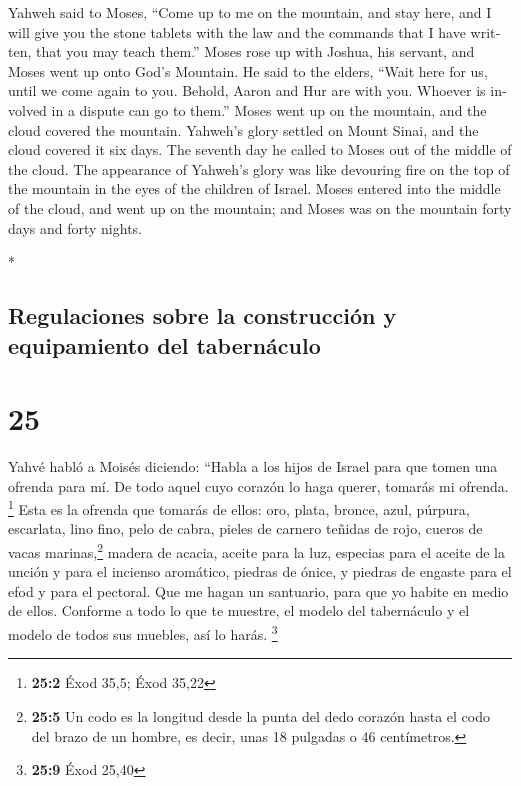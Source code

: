 \begin{paracol}{2}
\begin{otherlanguage}{english}
 Yahweh said to Moses, ``Come up to me on the mountain,
and stay here, and I will give you the stone tablets with the law and
the commands that I have written, that you may teach them.''
 Moses rose up with Joshua, his servant, and Moses went
up onto God's Mountain.  He said to the elders, ``Wait
here for us, until we come again to you. Behold, Aaron and Hur are with
you. Whoever is involved in a dispute can go to them.'' 
Moses went up on the mountain, and the cloud covered the mountain.
 Yahweh's glory settled on Mount Sinai, and the cloud
covered it six days. The seventh day he called to Moses out of the
middle of the cloud.  The appearance of Yahweh's glory
was like devouring fire on the top of the mountain in the eyes of the
children of Israel.  Moses entered into the middle of the
cloud, and went up on the mountain; and Moses was on the mountain forty
days and forty nights.

\end{otherlanguage}

\switchcolumn[0]*

\hypertarget{regulaciones-sobre-la-construcciuxf3n-y-equipamiento-del-tabernuxe1culo}{%
\subsection{Regulaciones sobre la construcción y equipamiento del
tabernáculo}\label{regulaciones-sobre-la-construcciuxf3n-y-equipamiento-del-tabernuxe1culo}}

\hypertarget{section-48}{%
\section{25}\label{section-48}}

 Yahvé habló a Moisés diciendo:  ``Habla a
los hijos de Israel para que tomen una ofrenda para mí. De todo aquel
cuyo corazón lo haga querer, tomarás mi ofrenda. \footnote{\textbf{25:2}
  Éxod 35,5; Éxod 35,22}  Esta es la ofrenda que tomarás
de ellos: oro, plata, bronce,  azul, púrpura, escarlata,
lino fino, pelo de cabra,  pieles de carnero teñidas de
rojo, cueros de vacas marinas,\footnote{\textbf{25:5} Un codo es la
  longitud desde la punta del dedo corazón hasta el codo del brazo de un
  hombre, es decir, unas 18 pulgadas o 46 centímetros.} madera de
acacia,  aceite para la luz, especias para el aceite de la
unción y para el incienso aromático,  piedras de ónice, y
piedras de engaste para el efod y para el pectoral.  Que
me hagan un santuario, para que yo habite en medio de ellos.
 Conforme a todo lo que te muestre, el modelo del
tabernáculo y el modelo de todos sus muebles, así lo harás. \footnote{\textbf{25:9}
  Éxod 25,40}


\end{paracol}
